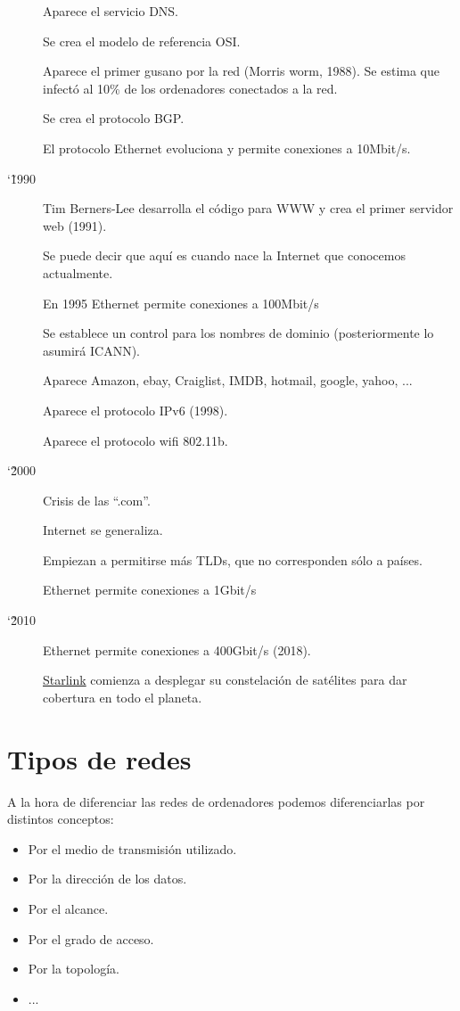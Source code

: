 \begin{description}
    Aparece el servicio DNS.

    Se crea el modelo de referencia OSI.

    Aparece el primer gusano por la red (Morris worm, 1988). Se estima que infectó al 10\% de los ordenadores conectados a la red.

    Se crea el protocolo BGP.

    El protocolo Ethernet evoluciona y permite conexiones a 10Mbit/s.


    \item[\char`\~ 1990]
    Tim Berners-Lee desarrolla el código para WWW y crea el primer servidor web (1991).

    Se puede decir que aquí es cuando nace la Internet que conocemos actualmente.

    En 1995 Ethernet permite conexiones a 100Mbit/s

    Se establece un control para los nombres de dominio (posteriormente lo asumirá ICANN).

    Aparece Amazon, ebay, Craiglist, IMDB, hotmail, google, yahoo, ...

    Aparece el protocolo IPv6 (1998).

    Aparece el protocolo wifi 802.11b.

    \item[\char`\~ 2000]
    Crisis de las “.com”.

    Internet se generaliza.

    Empiezan a permitirse más TLDs, que no corresponden sólo a países.

    Ethernet permite conexiones a 1Gbit/s

    \item[\char`\~ 2010]
    Ethernet permite conexiones a 400Gbit/s (2018).

    \href{https://en.wikipedia.org/wiki/Starlink}{Starlink} comienza a desplegar su constelación de satélites para dar cobertura en todo el planeta.


\end{description}

\section{Tipos de redes}
A la hora de diferenciar las redes de ordenadores podemos diferenciarlas por distintos conceptos:

\begin{itemize}
    \item Por el medio de transmisión utilizado.
    \item Por la dirección de los datos.
    \item Por el alcance.
    \item Por el grado de acceso.
    \item Por la topología.
    \item ...
\end{itemize}

